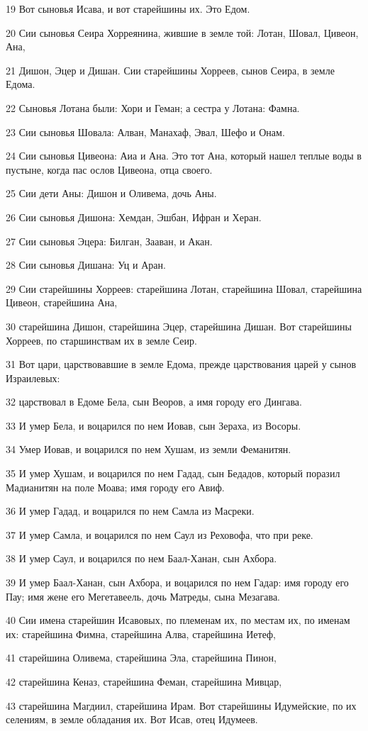 \par 19 Вот сыновья Исава, и вот старейшины их. Это Едом.
\par 20 Сии сыновья Сеира Хорреянина, жившие в земле той: Лотан, Шовал, Цивеон, Ана,
\par 21 Дишон, Эцер и Дишан. Сии старейшины Хорреев, сынов Сеира, в земле Едома.
\par 22 Сыновья Лотана были: Хори и Геман; а сестра у Лотана: Фамна.
\par 23 Сии сыновья Шовала: Алван, Манахаф, Эвал, Шефо и Онам.
\par 24 Сии сыновья Цивеона: Аиа и Ана. Это тот Ана, который нашел теплые воды в пустыне, когда пас ослов Цивеона, отца своего.
\par 25 Сии дети Аны: Дишон и Оливема, дочь Аны.
\par 26 Сии сыновья Дишона: Хемдан, Эшбан, Ифран и Херан.
\par 27 Сии сыновья Эцера: Билган, Зааван, и Акан.
\par 28 Сии сыновья Дишана: Уц и Аран.
\par 29 Сии старейшины Хорреев: старейшина Лотан, старейшина Шовал, старейшина Цивеон, старейшина Ана,
\par 30 старейшина Дишон, старейшина Эцер, старейшина Дишан. Вот старейшины Хорреев, по старшинствам их в земле Сеир.
\par 31 Вот цари, царствовавшие в земле Едома, прежде царствования царей у сынов Израилевых:
\par 32 царствовал в Едоме Бела, сын Веоров, а имя городу его Дингава.
\par 33 И умер Бела, и воцарился по нем Иовав, сын Зераха, из Восоры.
\par 34 Умер Иовав, и воцарился по нем Хушам, из земли Феманитян.
\par 35 И умер Хушам, и воцарился по нем Гадад, сын Бедадов, который поразил Мадианитян на поле Моава; имя городу его Авиф.
\par 36 И умер Гадад, и воцарился по нем Самла из Масреки.
\par 37 И умер Самла, и воцарился по нем Саул из Реховофа, что при реке.
\par 38 И умер Саул, и воцарился по нем Баал-Ханан, сын Ахбора.
\par 39 И умер Баал-Ханан, сын Ахбора, и воцарился по нем Гадар: имя городу его Пау; имя жене его Мегетавеель, дочь Матреды, сына Мезагава.
\par 40 Сии имена старейшин Исавовых, по племенам их, по местам их, по именам их: старейшина Фимна, старейшина Алва, старейшина Иетеф,
\par 41 старейшина Оливема, старейшина Эла, старейшина Пинон,
\par 42 старейшина Кеназ, старейшина Феман, старейшина Мивцар,
\par 43 старейшина Магдиил, старейшина Ирам. Вот старейшины Идумейские, по их селениям, в земле обладания их. Вот Исав, отец Идумеев.

